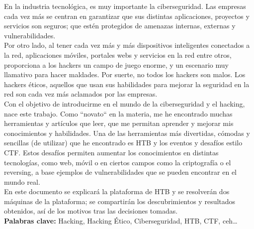 En la industria tecnológica,  es muy importante la ciberseguridad. Las empresas cada vez más se centran en garantizar que sus distintas aplicaciones, proyectos y servicios son seguros; que estén protegidos de amenazas internas, externas y vulnerabilidades.\\

Por otro lado, al tener cada vez más y más dispositivos inteligentes conectados a la red, aplicaciones móviles, portales webs y servicios en la red entre otros, proporciona a los hackers un campo de juego enorme, y un escenario muy llamativo para hacer maldades. Por suerte, no todos los hackers son malos. Los hackers éticos, aquellos que usan sus habilidades para mejorar la seguridad en la red son cada vez más aclamados por las empresas.\\

Con el objetivo de introducirme en el mundo de la ciberseguridad y el hacking, nace este trabajo. Como ``novato`` en la materia, me he encontrado muchas herramientas y artículos que leer, que me permitan aprender y mejorar mis conocimientos y habilidades. Una de las herramientas más divertidas, cómodas y sencillas (de utilizar) que he encontrado es \acrlong{HTB} y los eventos y desafíos estilo \acrlong{CTF}. Estos desafíos permiten aumentar los conocimientos en distintas tecnologías, como web, móvil o en ciertos campos como la criptografía o el reversing, a base ejemplos de vulnerabilidades que se pueden encontrar en el mundo real. \\

En este documento se explicará la plataforma de \acrlong{HTB} y se resolverán dos máquinas de la plataforma; se compartirán los descubrimientos y resultados obtenidos, así de los motivos tras las decisiones tomadas.\\

\textbf{Palabras clave:} Hacking, Hacking Ético, Ciberseguridad, \acrlong{HTB}, \acrlong{CTF}, \acrlong{ceh}\ldots
